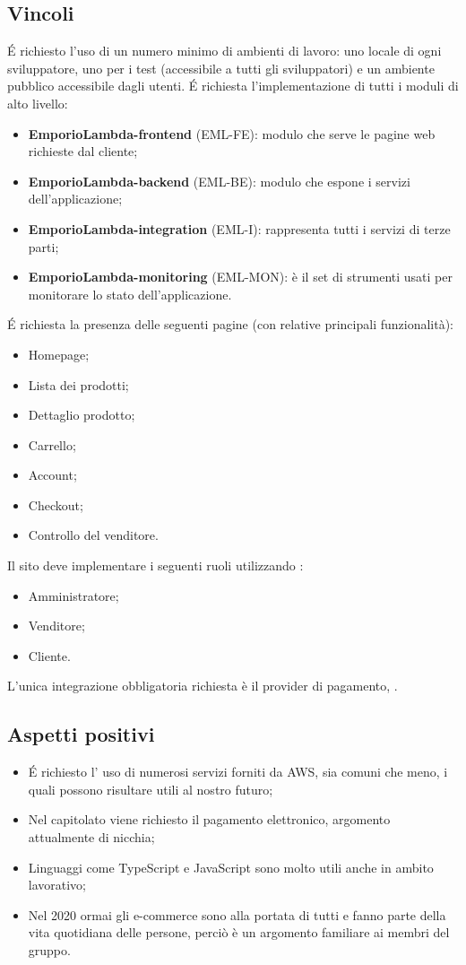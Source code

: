 \subsection{Vincoli}
\'E richiesto l'uso di un numero minimo di ambienti di lavoro: uno locale di ogni sviluppatore, uno per i test (accessibile a tutti gli sviluppatori) e un ambiente pubblico accessibile dagli utenti.
\'E richiesta l'implementazione di tutti i moduli di alto livello:
\begin{itemize}
\item	\textbf{EmporioLambda-frontend} (EML-FE): modulo che serve le pagine web richieste dal cliente;
\item	\textbf{EmporioLambda-backend} (EML-BE): modulo che espone i servizi dell'applicazione;
\item	\textbf{EmporioLambda-integration} (EML-I): rappresenta tutti i servizi di terze parti;
\item	\textbf{EmporioLambda-monitoring} (EML-MON): è il set di strumenti usati per monitorare lo stato dell'applicazione.
\end{itemize}
\'E richiesta la presenza delle seguenti pagine (con relative principali funzionalità):
\begin{itemize}
\item	Homepage;
\item	Lista dei prodotti;
\item	Dettaglio prodotto;
\item	Carrello;
\item	Account;
\item	Checkout;
\item	Controllo del venditore.
\end{itemize}
Il sito deve implementare i seguenti ruoli utilizzando :
\begin{itemize}
\item	Amministratore;
\item	Venditore;
\item	Cliente.
\end{itemize}
L'unica integrazione obbligatoria richiesta è il provider di pagamento, .
\subsection{Aspetti positivi}
\begin{itemize}
\item	\'E richiesto l' uso di numerosi servizi forniti da AWS, sia comuni che meno, i quali possono risultare utili al nostro futuro;
\item	Nel capitolato viene richiesto il pagamento elettronico, argomento attualmente di nicchia;
\item	Linguaggi come TypeScript e JavaScript sono molto utili anche in ambito lavorativo;
\item	Nel 2020 ormai gli e-commerce sono alla portata di tutti e fanno parte della vita quotidiana delle persone, perciò è un argomento familiare ai membri del gruppo.
\end{itemize}
